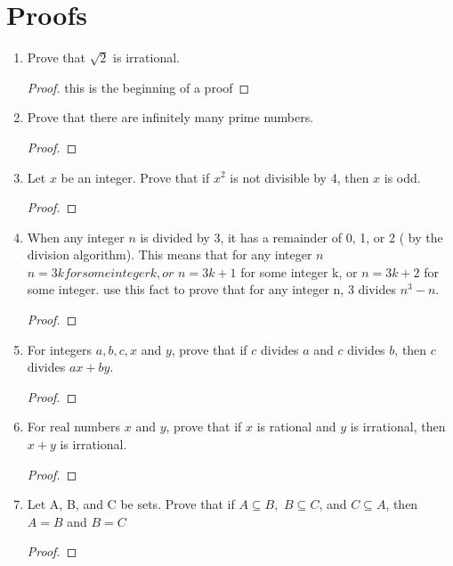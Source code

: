 \documentclass[11pt]{article}
\begin{document}
\section{Proofs}
\begin{enumerate}
    \item Prove that $\sqrt{2}$ is irrational.
        \begin{proof}
            this is the beginning of a proof
        \end{proof}
        
    \item Prove that there are infinitely many prime numbers.
        \begin{proof}
        \end{proof}
        
    \item Let $x$ be an integer. Prove that if $x^2$ is not divisible by 4, then $x$ is odd.
        \begin{proof}
        \end{proof}
        
    \item When any integer $n$ is divided by 3, it has a remainder of 0, 1, or 2 ( by the division algorithm). This means that for any integer $n$ 
            \newline \newline
             $n = 3k for some integer k, or$
            \newline
            $n = 3k+1$ for some integer k, or 
            \newline
            $n = 3k+2$ for some integer.
    use this fact to prove that for any integer n, 3 divides $n^3 - n$.
        \begin{proof}
        \end{proof}
        
    \item For integers $a,b,c,x$ and $y$, prove that if $c$ divides $a$ and $c$ divides $b$, then $c$ divides $ax+by$.
        \begin{proof}
        \end{proof}
        
    \item For real numbers $x$ and $y$, prove that if $x$ is rational and $y$ is irrational, then $x + y$ is irrational. 
        \begin{proof}
        \end{proof}
        
    \item Let A, B, and C be sets. Prove that if $A \subseteq B,$ $B \subseteq C$, and $C \subseteq A$, then $A = B$ and $B = C$
        \begin{proof}
        \end{proof}
        

\end{enumerate}
\end{document}
